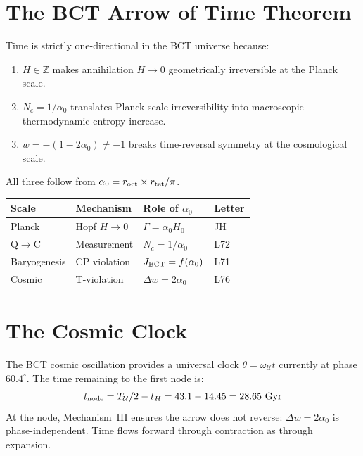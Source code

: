 \documentclass[aps,prl,twocolumn,showpacs,superscriptaddress]{revtex4-2}
\begin{document}
\section{The BCT Arrow of Time Theorem}

\begin{theorem}
Time is strictly one-directional in the BCT universe because:
\begin{enumerate}
\item[(i)] $H \in \mathbb{Z}$ makes annihilation $H\to 0$ geometrically 
irreversible at the Planck scale.
\item[(ii)] $N_c = 1/\alpha_0$ translates Planck-scale irreversibility into 
macroscopic thermodynamic entropy increase.
\item[(iii)] $w = -(1-2\alpha_0) \neq -1$ breaks time-reversal symmetry at 
the cosmological scale.
\end{enumerate}
All three follow from $\alpha_0 = r_{\rm oct} \times r_{\rm tet}/\pi$.
\end{theorem}

\begin{center}
\begin{tabular}{llll}
\toprule
Scale & Mechanism & Role of $\alpha_0$ & Letter \\
\midrule
Planck & Hopf $H\to0$ & $\Gamma = \alpha_0 H_0$ & JH \\
Q$\to$C & Measurement & $N_c = 1/\alpha_0$ & L72 \\
Baryogenesis & CP violation & $J_{\rm BCT} = f(\alpha_0)$ & L71 \\
Cosmic & T-violation & $\Delta w = 2\alpha_0$ & L76 \\
\bottomrule
\end{tabular}
\end{center}

\section{The Cosmic Clock}

The BCT cosmic oscillation provides a universal clock $\theta = \omega_\mathcal{U} t$ 
currently at phase $60.4^\circ$. The time remaining to the first node is:
\begin{equation}
    t_{\rm node} = T_\mathcal{U}/2 - t_H = 43.1 - 14.45 = 28.65~\text{Gyr}
\end{equation}
At the node, Mechanism~III ensures the arrow does not reverse: $\Delta w = 2\alpha_0$ 
is phase-independent. Time flows forward through contraction as through expansion.
\end{document}
